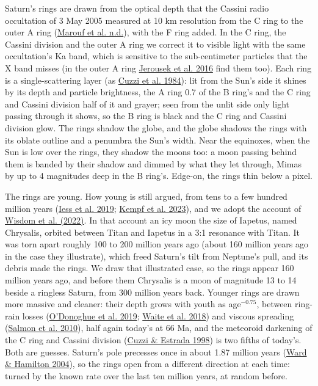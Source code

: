 \documentclass[9pt,twocolumn]{extarticle}
\begin{document}
Saturn's rings are drawn from the optical depth that the Cassini radio occultation of 3 May 2005 measured at 10 km resolution from the C ring to the outer A ring (\protect\hyperlink{cite.marouf_corss}{Marouf et al. n.d.}), with the F ring added. In the C ring, the Cassini division and the outer A ring we correct it to visible light with the same occultation's Ka band, which is sensitive to the sub-centimeter particles that the X band misses (in the outer A ring \protect\hyperlink{cite.jerousek2016}{Jerousek et al. 2016} find them too). Each ring is a single-scattering layer (as \protect\hyperlink{cite.cuzzi1984}{Cuzzi et al. 1984}): lit from the Sun's side it shines by its depth and particle brightness, the A ring 0.7 of the B ring's and the C ring and Cassini division half of it and grayer; seen from the unlit side only light passing through it shows, so the B ring is black and the C ring and Cassini division glow. The rings shadow the globe, and the globe shadows the rings with its oblate outline and a penumbra the Sun's width. Near the equinoxes, when the Sun is low over the rings, they shadow the moons too: a moon passing behind them is banded by their shadow and dimmed by what they let through, Mimas by up to 4 magnitudes deep in the B ring's. Edge-on, the rings thin below a pixel.

The rings are young. How young is still argued, from tens to a few hundred million years (\protect\hyperlink{cite.iess2019}{Iess et al. 2019}; \protect\hyperlink{cite.kempf2023}{Kempf et al. 2023}), and we adopt the account of \protect\hyperlink{cite.wisdom2022}{Wisdom et al. (2022)}. In that account an icy moon the size of Iapetus, named Chrysalis, orbited between Titan and Iapetus in a 3:1 resonance with Titan. It was torn apart roughly 100 to 200 million years ago (about 160 million years ago in the case they illustrate), which freed Saturn's tilt from Neptune's pull, and its debris made the rings. We draw that illustrated case, so the rings appear 160 million years ago, and before them Chrysalis is a moon of magnitude 13 to 14 beside a ringless Saturn, from 300 million years back. Younger rings are drawn more massive and cleaner: their depth grows with youth as age$^{-0.75}$, between ring-rain losses (\protect\hyperlink{cite.odonoghue2019}{O'Donoghue et al. 2019}; \protect\hyperlink{cite.waite2018}{Waite et al. 2018}) and viscous spreading (\protect\hyperlink{cite.salmon2010}{Salmon et al. 2010}), half again today's at 66 Ma, and the meteoroid darkening of the C ring and Cassini division (\protect\hyperlink{cite.cuzzi1998}{Cuzzi \& Estrada 1998}) is two fifths of today's. Both are guesses. Saturn's pole precesses once in about 1.87 million years (\protect\hyperlink{cite.ward2004}{Ward \& Hamilton 2004}), so the rings open from a different direction at each time: turned by the known rate over the last ten million years, at random before.
\end{document}

